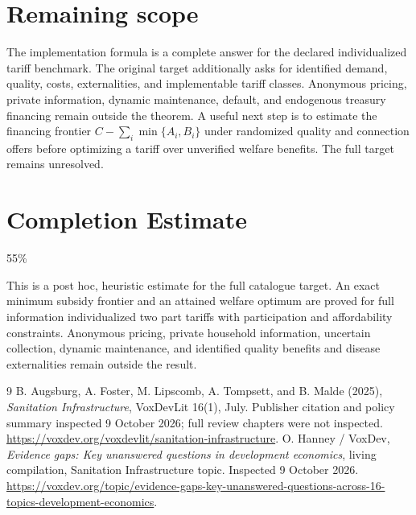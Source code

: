 \documentclass[11pt]{article}
\theoremstyle{remark}
\begin{document}
\section{Remaining scope}
The implementation formula is a complete answer for the declared individualized tariff benchmark. The original target additionally asks for identified demand, quality, costs, externalities, and implementable tariff classes. Anonymous pricing, private information, dynamic maintenance, default, and endogenous treasury financing remain outside the theorem. A useful next step is to estimate the financing frontier $C-\sum_i\min\{A_i,B_i\}$ under randomized quality and connection offers before optimizing a tariff over unverified welfare benefits. The full target remains unresolved.

\section{Completion Estimate}
55\%

This is a post hoc, heuristic estimate for the full catalogue target.
An exact minimum subsidy frontier and an attained welfare optimum are proved for full information individualized two part tariffs with participation and affordability constraints. Anonymous pricing, private household information, uncertain collection, dynamic maintenance, and identified quality benefits and disease externalities remain outside the result.

\begin{thebibliography}{9}
 B. Augsburg, A. Foster, M. Lipscomb, A. Tompsett, and B. Malde (2025), \emph{Sanitation Infrastructure}, VoxDevLit 16(1), July. Publisher citation and policy summary inspected 9 October 2026; full review chapters were not inspected. \url{https://voxdev.org/voxdevlit/sanitation-infrastructure}.
 O. Hanney / VoxDev, \emph{Evidence gaps: Key unanswered questions in development economics}, living compilation, Sanitation Infrastructure topic. Inspected 9 October 2026. \url{https://voxdev.org/topic/evidence-gaps-key-unanswered-questions-across-16-topics-development-economics}.
\end{thebibliography}
\end{document}
